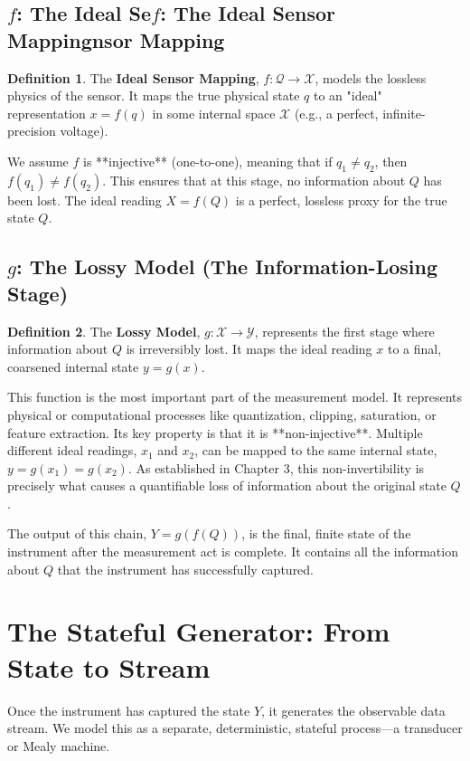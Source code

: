 \documentclass[12pt]{article}
\theoremstyle{definition}
\newtheorem{definition}{Definition}[section]
\begin{document}
\subsection{$f$: The Ideal Se$f$: The Ideal Sensor Mappingnsor Mapping}
\begin{definition}
The \textbf{Ideal Sensor Mapping}, $f: \mathcal{Q} \to \mathcal{X}$, models the lossless physics of the sensor. It maps the true physical state $q$ to an "ideal" representation $x = f(q)$ in some internal space $\mathcal{X}$ (e.g., a perfect, infinite-precision voltage).
\end{definition}
We assume $f$ is **injective** (one-to-one), meaning that if $q_1 \neq q_2$, then $f(q_1) \neq f(q_2)$. This ensures that at this stage, no information about $Q$ has been lost. The ideal reading $X = f(Q)$ is a perfect, lossless proxy for the true state $Q$.

\subsection{$g$: The Lossy Model (The Information-Losing Stage)}
\begin{definition}
The \textbf{Lossy Model}, $g: \mathcal{X} \to \mathcal{Y}$, represents the first stage where information about $Q$ is irreversibly lost. It maps the ideal reading $x$ to a final, coarsened internal state $y=g(x)$.
\end{definition}
This function is the most important part of the measurement model. It represents physical or computational processes like quantization, clipping, saturation, or feature extraction. Its key property is that it is **non-injective**. Multiple different ideal readings, $x_1$ and $x_2$, can be mapped to the same internal state, $y = g(x_1) = g(x_2)$. As established in Chapter 3, this non-invertibility is precisely what causes a quantifiable loss of information about the original state $Q$.

The output of this chain, $Y = g(f(Q))$, is the final, finite state of the instrument after the measurement act is complete. It contains all the information about $Q$ that the instrument has successfully captured.

\section{The Stateful Generator: From State to Stream}

Once the instrument has captured the state $Y$, it generates the observable data stream. We model this as a separate, deterministic, stateful process—a transducer or Mealy machine.
\end{document}
